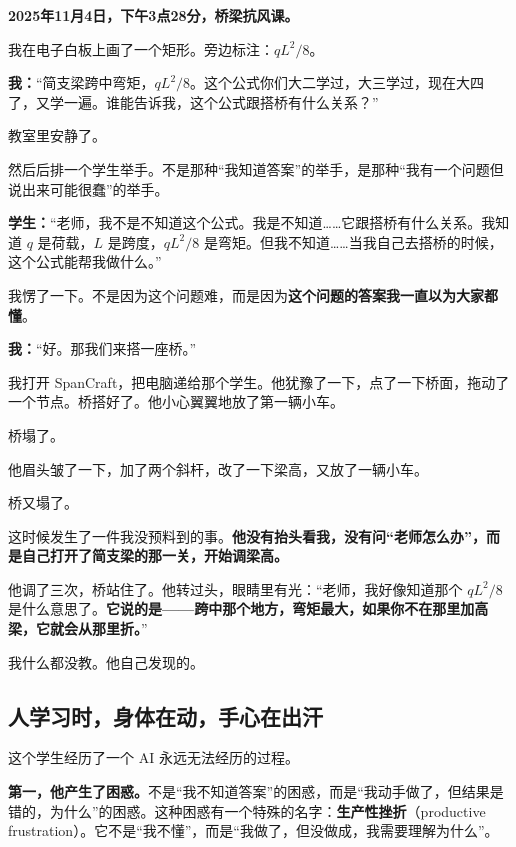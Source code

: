 \begin{classroom-scene}
\label{scene:chap1-student}

{
\noindent \textbf{2025年11月4日，下午3点28分，桥梁抗风课。}

\vspace{0.5cm}

\noindent 我在电子白板上画了一个矩形。旁边标注：$qL^2/8$。

\noindent\textbf{我：}“简支梁跨中弯矩，$qL^2/8$。这个公式你们大二学过，大三学过，现在大四了，又学一遍。谁能告诉我，这个公式跟搭桥有什么关系？”

\noindent 教室里安静了。

\noindent 然后后排一个学生举手。不是那种“我知道答案”的举手，是那种“我有一个问题但说出来可能很蠢”的举手。

\noindent\textbf{学生：}“老师，我不是不知道这个公式。我是不知道\ldots\ldots 它跟搭桥有什么关系。我知道 $q$ 是荷载，$L$ 是跨度，$qL^2/8$ 是弯矩。但我不知道\ldots\ldots 当我自己去搭桥的时候，这个公式能帮我做什么。”

\noindent 我愣了一下。不是因为这个问题难，而是因为\textbf{这个问题的答案我一直以为大家都懂}。

\noindent\textbf{我：}“好。那我们来搭一座桥。”

\noindent 我打开 SpanCraft，把电脑递给那个学生。他犹豫了一下，点了一下桥面，拖动了一个节点。桥搭好了。他小心翼翼地放了第一辆小车。

\noindent 桥塌了。

\noindent 他眉头皱了一下，加了两个斜杆，改了一下梁高，又放了一辆小车。

\noindent 桥又塌了。

\noindent 这时候发生了一件我没预料到的事。\textbf{他没有抬头看我，没有问“老师怎么办”，而是自己打开了简支梁的那一关，开始调梁高。}

\noindent 他调了三次，桥站住了。他转过头，眼睛里有光：“老师，我好像知道那个 $qL^2/8$ 是什么意思了。\textbf{它说的是——跨中那个地方，弯矩最大，如果你不在那里加高梁，它就会从那里折。}”

\noindent 我什么都没教。他自己发现的。
}
\end{classroom-scene}

\subsection{人学习时，身体在动，手心在出汗}

这个学生经历了一个 AI 永远无法经历的过程。

\textbf{第一，他产生了困惑。}不是“我不知道答案”的困惑，而是“我动手做了，但结果是错的，为什么”的困惑。这种困惑有一个特殊的名字：\textbf{生产性挫折}（productive frustration）。它不是“我不懂”，而是“我做了，但没做成，我需要理解为什么”。

